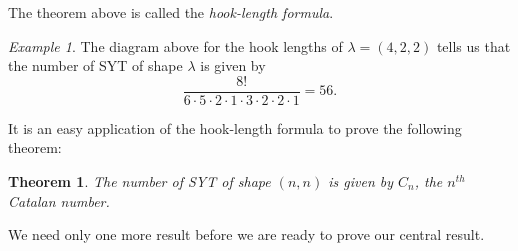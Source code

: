\documentclass[11pt,letterpaper,twoside,english]{article}
\theoremstyle{theorem}
\newtheorem{theorem}{Theorem}
\theoremstyle{remark}
\newtheorem{example}{Example}
\begin{document}
The theorem above is called the \emph{hook-length formula}.

\begin{example}
The diagram above for the hook lengths of $\lambda=(4, 2, 2)$ tells us that the number of SYT of shape $\lambda$ is given by
\[\frac{8!}{6\cdot 5\cdot 2 \cdot 1 \cdot 3 \cdot 2 \cdot 2\cdot 1}=56.\]
\end{example}

It is an easy application of the hook-length formula to prove the following theorem:

\begin{theorem}
\label{catalan_2}
The number of SYT of shape $(n, n)$ is given by $C_n$, the $n^{th}$ Catalan number.
\end{theorem}

We need only one more result before we are ready to prove our central result.
\end{document}
